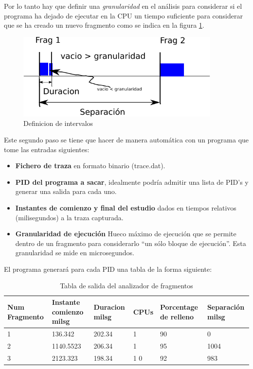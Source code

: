 \documentclass[a4paper,11pt,spanish,twoside]{article}
\begin{document}
Por lo tanto hay que definir una \emph{granularidad} en el análisis
para considerar si el programa ha dejado de ejecutar en la CPU un
tiempo suficiente para considerar que se ha creado un nuevo fragmento
como se indica en la figura \ref{fig:intervalos}.

\begin{figure}[h!]
  \centering
\includegraphics[width=4in]{figuras/intervalos-crop.pdf}  
  \caption{Definicion de intervalos}
  \label{fig:intervalos}
\end{figure}


Este segundo paso se tiene que hacer de manera automática con un
programa que tome las entradas siguientes:

\begin{itemize}
\item \textbf{Fichero de traza} en formato binario (trace.dat).
\item \textbf{PID del programa a sacar}, idealmente podría admitir una
  lista de PID's y generar una salida para cada uno.
\item \textbf{Instantes de comienzo y final del estudio} dados en
  tiempos relativos (milisegundos) a la traza capturada.
\item \textbf{Granularidad de ejecución} Hueco máximo de ejecución que
  se permite dentro de un fragmento para considerarlo ``un sólo bloque
  de ejecución''.  Esta granularidad se mide en microsegundos.
\end{itemize}

El programa generará para cada PID una tabla de la forma siguiente:

\begin{table}[h!]
  \centering
  \begin{tabular}{p{0.7in}|p{0.7in}|p{0.7in}|p{0.7in}|p{0.7in}|p{0.7in}}
    \textbf{Num Fragmento} & \textbf{Instante comienzo milsg} &
    \textbf{Duracion milsg} & \textbf{CPUs} & \textbf{Porcentage
      de relleno} & \textbf{Separación milsg}\\ \hline
1 & 136.342 & 202.34 & 1 & 90 & 0 \\
2 & 1140.5523 & 206.34 & 1 & 95 & 1004 \\ 
3 & 2123.323 & 198.34 & 1 0 & 92 & 983\\
  \end{tabular}
  \caption{Tabla de salida del analizador de fragmentos}
  \label{tab:analisis}
\end{table}
\end{document}

